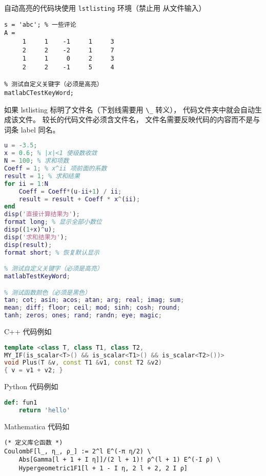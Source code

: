 自动高亮的代码块使用 \verb|lstlisting| 环境（禁止用 \verb|| 从文件输入）
\begin{lstlisting}[language=matlabC]
s = 'abc'; % 一些评论
A =
     1     1    -1     1     3
     2     2    -2     1     7
     1     1     0     2     3
     2     2    -1     5     4

% 测试自定义关键字（必须是高亮）
matlabCTestKeyWord;
\end{lstlisting}

如果 lstlisting 标明了文件名（下划线需要用 \verb|\_| 转义）， 代码文件夹中就会自动生成该文件。 较长的代码文件必须含文件名， 文件名需要反映代码的内容而不是与词条 label 同名。

\begin{lstlisting}[language=matlab, caption=sample\_code.m]
% 验证二项式定理(非整数幂)
u = -3.5;
x = 0.6; % |x|<1 使级数收敛
N = 100; % 求和项数
Coeff = 1; % x^ii 项前面的系数
result = 1; % 求和结果
for ii = 1:N
    Coeff = Coeff*(u-ii+1) / ii;
    result = result + Coeff * x^(ii);
end
disp('直接计算结果为');
format long; % 显示全部小数位
disp((1+x)^u);
disp('求和结果为');
disp(result);
format short; % 恢复默认显示

% 测试自定义关键字（必须是高亮）
matlabTestKeyWord;

% 测试函数颜色（必须是黑色）
tan; cot; asin; acos; atan; arg; real; imag; sum;
mean; diff; floor; ceil; mod; sinh; cosh; round;
tanh; zeros; ones; rand; randn; eye; magic;
\end{lstlisting}

C++ 代码例如
\begin{lstlisting}[language=cpp]
template <class T, class T1, class T2,
MY_IF(is_scalar<T>() && is_scalar<T1>() && is_scalar<T2>())>
void Plus(T &v, const T1 &v1, const T2 &v2)
{ v = v1 + v2; }
\end{lstlisting}

Python 代码例如
\begin{lstlisting}[language=python]
def: fun1
	return 'hello'
\end{lstlisting}

Mathematica 代码如
\begin{lstlisting}[language=mma]
(* 定义库仑函数 *)
CoulombF[l_, η_, ρ_] := 2^l E^(-π η/2) \
    Abs[Gamma[l + 1 + I η]]/(2 l + 1)! ρ^(l + 1) E^(-I ρ) \
    Hypergeometric1F1[l + 1 - I η, 2 l + 2, 2 I ρ]
\end{lstlisting}

